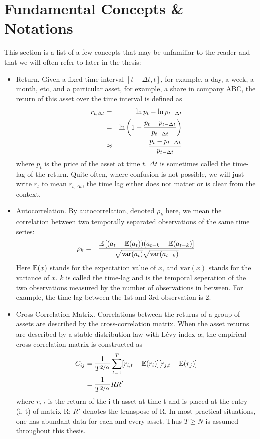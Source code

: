 \documentclass{report}
\begin{document}
\section{Fundamental Concepts \&
  Notations}\label{sec:FundamentalConcepts}
This section is a list of a few concepts that may be unfamiliar to the
reader and that we will often refer to later in the thesis:
\begin{itemize}
\item Return. Given a fixed time interval $[t - \Delta t, t]$, for example, a
  day, a week, a month, etc, and a particular asset, for example, a
  share in company ABC, the return of this asset over the time
  interval is defined as
  \begin{eqnarray*}
    r_{t, \Delta t} &=& \ln p_{t} - \ln p_{t - \Delta t} \\
    &=& \ln \left(1 + {p_{t} - p_{t - \Delta t} \over p_{t - \Delta t}}\right) \\
    &\approx& {p_{t} - p_{t - \Delta t} \over p_{t - \Delta t}}
  \end{eqnarray*}
  where $p_t$ is the price of the asset at time $t$. $\Delta t$ is
  sometimes called the time-lag of the return. Quite often, where
  confusion is not possible, we will just write $r_t$ to mean $r_{t,
    \Delta t}$, the time lag either does not matter or is clear from
  the context.

\item Autocorrelation. By autocorrelation, denoted $\rho_k$ here, we
  mean the correlation between two temporally separated observations
  of the same time series:
  \begin{eqnarray*}
    \rho_k &=& {
      \mathbb{E}\left[(a_t -\mathbb{E}(a_t))(a_{t-k} - \mathbb{E}(a_{t-k})\right]
      \over
      \sqrt{\text{var}(a_t)}\sqrt{\text{var}(a_{t-k})}
    }
  \end{eqnarray*}
  Here $\mathbb{E}(x)$ stands for the expectation value of $x$, and
  $\text{var}(x)$ stands for the variance of $x$. $k$ is called the
  time-lag and is the temporal seperation of the two observations
  measured by the number of observations in between. For example, the
  time-lag between the 1st and 3rd observation is 2.

\item Cross-Correlation Matrix. Correlations between the returns of a
  group of assets are described by the cross-correlation matrix. When
  the asset returns are described by a stable distribution law with
  L\'evy index $\alpha$, the empirical cross-correlation matrix is
  constructed as
  \begin{equation}
    \label{eq:cross-correlation}
    \begin{aligned}
      C_{ij} &= {1 \over T^{2/\alpha}} \sum_{t=1}^T [r_{i,t}-\mathbb{E}(r_i)]
      [r_{j,t}-\mathbb{E}(r_j)] \\
      &= {1 \over T^{2/\alpha}} RR'
    \end{aligned}
  \end{equation}
  where $r_{i,t}$ is the return of the i-th asset at time t and is
  placed at the entry (i, t) of matrix R; $R'$ denotes the
  transpose of R. In most practical situations, one has abundant data
  for each and every asset. Thus $T \geq N$ is assumed throughout this
  thesis.


\end{itemize}
\end{document}
